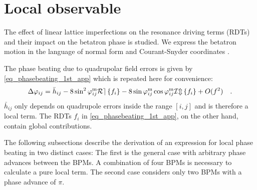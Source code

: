 %
%
%



\section{Local observable}
\label{sec:localobs}


The effect of linear
lattice imperfections on the resonance driving terms (RDTs) and their impact on the betatron phase is
studied.
We express the betatron motion in the language of normal form and Courant-Snyder coordinates
\cite{Bartolini1997}.

The phase beating due to quadrupolar field errors is given by \eqref{eq_phasebeating_1st_app}
which is repeated here for convenience:
%
\begin{align}
  \Delta\varphi_{ij} = \bar{h}_{ij} - 8 \sin^2\varphi_{ij}^\text{m}\mathcal{Re} \left\{ f_i \right\} - 8\sin\varphi_{ij}^\text{m} \cos\varphi_{ij}^\text{m}\mathcal{Im} \left\{ f_i \right\} 
 +O(f^2)
\quad .
\label{eq_phasebeating_1st_app_again}
\end{align}
%
$\bar{h}_{ij}$ only depends on quadrupole errors inside the range $[i,j]$ and is therefore a local
term. The RDTs $f_i$ in \eqref{eq_phasebeating_1st_app}, on the other hand, contain global contributions.

The following subsections describe the derivation of an expression for local phase beating in two distinct
cases: The first is the general case with arbitrary phase advances between the BPMs. A combination of
four BPMs is necessary to calculate a pure local term. The second case considers only two BPMs with a
phase advance of $\pi$.

